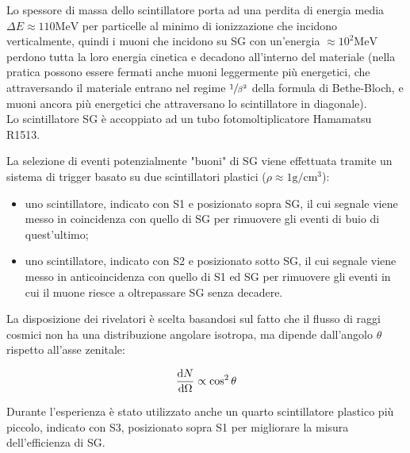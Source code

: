 \documentclass[a4paper, 11pt]{article}
\begin{document}
        Lo spessore di massa dello scintillatore porta ad una perdita di energia media $\Delta E\approx110\unit{\mega\electronvolt}$ per particelle al minimo di ionizzazione che incidono verticalmente, quindi i muoni che incidono su SG con un'energia $\approx10^2\unit{\mega\electronvolt}$ perdono tutta la loro energia cinetica e decadono all'interno del materiale (nella pratica possono essere fermati anche muoni leggermente più energetici, che attraversando il materiale entrano nel regime $\sfrac{1}{\beta^2}$ della formula di Bethe-Bloch, e muoni ancora più energetici che attraversano lo scintillatore in diagonale).
        \\
        Lo scintillatore SG è accoppiato ad un tubo fotomoltiplicatore Hamamatsu R1513.

        La selezione di eventi potenzialmente "buoni" di SG viene effettuata tramite un sistema di trigger basato su due scintillatori plastici ($\rho\approx1\unit{\gram\per\centi\metre\cubed}$):

        \begin{itemize}
            \item uno scintillatore, indicato con S1 e posizionato sopra SG, il cui segnale viene messo in coincidenza con quello di SG per rimuovere gli eventi di buio di quest'ultimo;
            \item uno scintillatore, indicato con S2 e posizionato sotto SG, il cui segnale viene messo in anticoincidenza con quello di S1 ed SG per rimuovere gli eventi in cui il muone riesce a oltrepassare SG senza decadere.
        \end{itemize}
    
        La disposizione dei rivelatori è scelta basandosi sul fatto che il flusso di raggi cosmici non ha una distribuzione angolare isotropa, ma dipende dall'angolo $\theta$ rispetto all'asse zenitale:
    
        \begin{equation*}
            \dv{N}{\Omega}\propto\cos^2\theta
        \end{equation*}

        Durante l'esperienza è stato utilizzato anche un quarto scintillatore plastico più piccolo, indicato con S3, posizionato sopra S1 per migliorare la misura dell'efficienza di SG.
\end{document}
